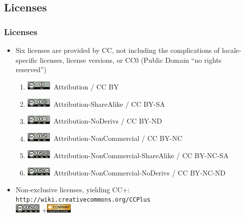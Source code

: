 \documentclass[mathserif,xcolor=dvipsnames,hyperref={bookmarks=true}]{beamer}
\begin{document}
    \subsection{Licenses}
    \begin{frame}[t]
        \frametitle{Licenses}
        \begin{itemize}
            \item Six licenses are provided by CC, not including the
             complications of locale-specific licenses, license versions, or CC0 (Public
             Domain ``no rights reserved'')
            \begin{enumerate}
              \item \includegraphics[width=0.1\textwidth]{resources/cc/by.pdf}\ Attribution / CC BY
              \item \includegraphics[width=0.1\textwidth]{resources/cc/by_sa.pdf}\ Attribution-ShareAlike / CC BY-SA
              \item \includegraphics[width=0.1\textwidth]{resources/cc/by_nd.pdf}\ Attribution-NoDerivs / CC BY-ND
              \item \includegraphics[width=0.1\textwidth]{resources/cc/by_nc.pdf}\ Attribution-NonCommercial / CC BY-NC
              \item \includegraphics[width=0.1\textwidth]{resources/cc/by_nc_sa.pdf}\ Attribution-NonCommercial-ShareAlike / CC BY-NC-SA
              \item \includegraphics[width=0.1\textwidth]{resources/cc/by_nc_nd.pdf}\ Attribution-NonCommercial-NoDerivs / CC BY-NC-ND
            \end{enumerate}
            \item Non-exclusive licenses, yielding CC+: \texttt{http://wiki.creativecommons.org/CCPlus} \\
              \includegraphics[width=0.1\textwidth]{resources/cc/by_nc_sa.pdf} +\includegraphics[width=0.1\textwidth]{resources/cc/CommercialLicenseButton.pdf}
        \end{itemize}
    \end{frame}
\end{document}
